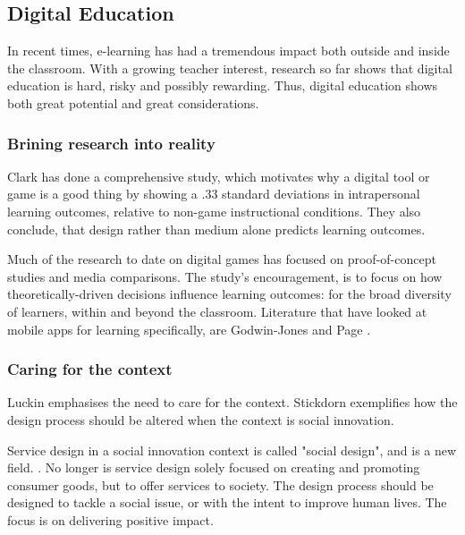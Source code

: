     

    \subsection{Digital Education}

    In recent times, e-learning has had a tremendous impact both outside and inside the classroom. With a growing teacher interest, research so far shows that digital education is hard, risky and possibly rewarding. \citep{luckin} Thus, digital education shows both great potential and great considerations.

    \subsubsection{Brining research into reality}

    Clark \citep{gates} has done a comprehensive study, which motivates why a digital tool or game is a good thing by showing a .33 standard deviations in intrapersonal learning outcomes, relative to non-game instructional conditions. They also conclude, that design rather than medium alone predicts learning outcomes.

    Much of the research to date on digital games has focused on proof-of-concept studies and media comparisons. The study's encouragement, is to focus on how theoretically-driven decisions influence learning outcomes: for the broad diversity of learners, within and beyond the classroom. Literature that have looked at mobile apps for learning specifically, are Godwin-Jones \citep{godwin-jones} and Page \citep{page}.

    \subsubsection{Caring for the context}
    Luckin \citep{luckin} emphasises the need to care for the context. Stickdorn \citep{stickdorn} exemplifies how the design process should be altered when the context is social innovation.

    Service design in a social innovation context is called "social design", and is a new field. \citep{stickdorn}. No longer is service design solely focused on creating and promoting consumer goods, but to offer services to society. The design process should be designed to tackle a social issue, or with the intent to improve human lives. The focus is on delivering positive impact.

